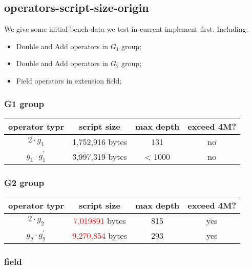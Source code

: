 \subsection{operators-script-size-origin}

We give some initial bench data we test in current implement first. Including:

\begin{itemize}
    \item Double and Add operators in $G_1$ group;
    \item Double and Add operators in $G_2$ group;
    \item Field operators in extension field;
\end{itemize}

\subsubsection{G1 group}

\begin{center}
\begin{tabular}{|c|c|c|c|} \hline
operator typr & script size & max depth & exceed 4M? \\ \hline
$2 \cdot g_1$ & 1,752,916 bytes & 131 & no  \\ \hline
$g_1 \cdot g_1^{'}$ & 3,997,319 bytes &	< 1000 & no \\ \hline
\end{tabular}
\end{center}

\subsubsection{G2 group}

\begin{center}
\begin{tabular}{|c|c|c|c|} \hline
operator typr & script size & max depth & exceed 4M? \\ \hline
$2 \cdot g_2$ & \textcolor{red}{7,019891} bytes & 815 & yes  \\ \hline
$g_2 \cdot g_2^{'}$ & \textcolor{red}{9,270,854} bytes &	293 & yes \\ \hline
\end{tabular}
\end{center}

\subsubsection{field}

